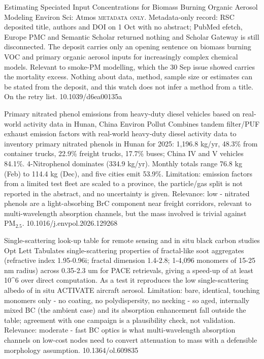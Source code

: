 \documentclass[10pt]{article}
\begin{document}
{Estimating Speciated Input Concentrations for Biomass Burning Organic Aerosol Modeling}
{Environ Sci: Atmos}
{\textsc{metadata only.} Metadata-only record: RSC deposited title, authors and DOI on 1 Oct with no abstract; PubMed efetch, Europe PMC and Semantic Scholar returned nothing and Scholar Gateway is still disconnected. The deposit carries only an opening sentence on biomass burning VOC and primary organic aerosol inputs for increasingly complex chemical models. Relevant to smoke-PM modelling, which the 30 Sep issue showed carries the mortality excess. Nothing about data, method, sample size or estimates can be stated from the deposit, and this watch does not infer a method from a title. On the retry list.}
{10.1039/d6ea00135a}

{Primary nitrated phenol emissions from heavy-duty diesel vehicles based on real-world activity data in Hunan, China}
{Environ Pollut}
{Combines tandem filter/PUF exhaust emission factors with real-world heavy-duty diesel activity data to inventory primary nitrated phenols in Hunan for 2025: 1,196.8 kg/yr, 48.3\% from container trucks, 22.9\% freight trucks, 17.7\% buses; China IV and V vehicles 84.1\%. 4-Nitrophenol dominates (334.9 kg/yr). Monthly totals range 76.8 kg (Feb) to 114.4 kg (Dec), and five cities emit 53.9\%. Limitation: emission factors from a limited test fleet are scaled to a province, the particle/gas split is not reported in the abstract, and no uncertainty is given. Relevance: low - nitrated phenols are a light-absorbing BrC component near freight corridors, relevant to multi-wavelength absorption channels, but the mass involved is trivial against PM$_{2.5}$.}
{10.1016/j.envpol.2026.129268}

\par{}\baselineskip{}\baselineskip
{}

{Single-scattering look-up table for remote sensing and in situ black carbon studies}
{Opt Lett}
{Tabulates single-scattering properties of fractal-like soot aggregates (refractive index 1.95-0.96i; fractal dimension 1.4-2.8; 1-4,096 monomers of 15-25 nm radius) across 0.35-2.3 um for PACE retrievals, giving a speed-up of at least 10\textasciicircum{}6 over direct computation. As a test it reproduces the low single-scattering albedo of in situ ACTIVATE aircraft aerosol. Limitation: bare, identical, touching monomers only - no coating, no polydispersity, no necking - so aged, internally mixed BC (the ambient case) and its absorption enhancement fall outside the table; agreement with one campaign is a plausibility check, not validation. Relevance: moderate - fast BC optics is what multi-wavelength absorption channels on low-cost nodes need to convert attenuation to mass with a defensible morphology assumption.}
{10.1364/ol.609835}
\end{document}
